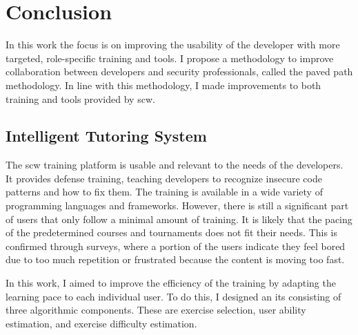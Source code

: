 \chapter{Conclusion}
\glsresetall

In this work the focus is on improving the usability of the developer with more targeted, role-specific training and tools.
I propose a methodology to improve collaboration between developers and security professionals, called the paved path methodology.
In line with this methodology, I made improvements to both training and tools provided by \gls{scw}.


\section{Intelligent Tutoring System}
The \gls{scw} training platform is usable and relevant to the needs of the developers.
It provides defense training, teaching developers to recognize insecure code patterns and how to fix them.
The training is available in a wide variety of programming languages and frameworks.
However, there is still a significant part of users that only follow a minimal amount of training.
It is likely that the pacing of the predetermined courses and tournaments does not fit their needs.
This is confirmed through surveys, where a portion of the users indicate they feel bored due to too much repetition or frustrated because the content is moving too fast.

In this work, I aimed to improve the efficiency of the training by adapting the learning pace to each individual user.
To do this, I designed an \gls{its} consisting of three algorithmic components.
These are exercise selection, user ability estimation, and exercise difficulty estimation.

